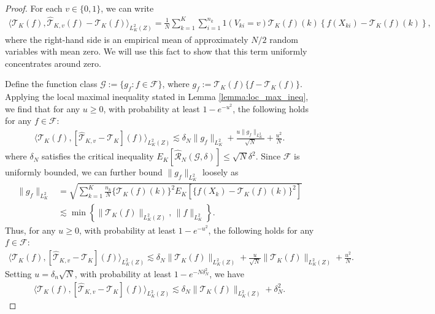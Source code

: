 \documentclass[11pt]{article}
\theoremstyle{plain}
\theoremstyle{definition}
\theoremstyle{remark}
\theoremstyle{definition}
\begin{document}
\begin{proof}

For each $v \in \{0,1\}$, we can write
\begin{align*}
    \langle  \mathcal{T}_{K}(f), \widehat{\mathcal{T}}_{K,v}(f) - \mathcal{T}_{K}(f)\rangle_{L^2_K(Z)} =  \frac{1}{N} \sum_{k=1}^K \sum_{i=1}^{n_k} 1(V_{ki} = v) \mathcal{T}_{K}(f)(k)\left\{f(X_{ki}) - \mathcal{T}_{K}(f)(k) \right\},
\end{align*}
where the right-hand side is an empirical mean of approximately $N/2$ random variables with mean zero. We will use this fact to show that this term uniformly concentrates around zero. 



    Define the function class $\mathcal{G} := \{g_f: f \in \mathcal{F} \}$, where $g_f:= \mathcal{T}_{K}(f)\{f -  \mathcal{T}_{K}(f)\}$. Applying the local maximal inequality stated in Lemma \ref{lemma:loc_max_ineq}, we find that for any $u \geq 0$, with probability at least $1 - e^{-u^2}$, the following holds for any $f \in \mathcal{F}$:
\begin{align*}
  \langle  \mathcal{T}_{K}(f), [\widehat{\mathcal{T}}_{K,v} -  \mathcal{T}_{K}](f) \rangle_{L^2_K(Z)} \lesssim \delta_N \|g_f\|_{L^2_K} + \frac{u\|g_f\|_{L^2_K}}{\sqrt{N}} + \frac{u^2}{N}.
\end{align*}
where $\delta_N$ satisfies the critical inequality $E_K[\widehat{\mathcal{R}}_N(\mathcal{G}, \delta)]\leq \sqrt{N} \delta^2$. Since $\mathcal{F}$ is uniformly bounded, we can further bound $\|g_f\|_{L^2_K}$ loosely as
\begin{align*}
    \|g_f\|_{L^2_K} &= \sqrt{\sum_{k=1}^{K} \frac{n_k}{N}\{ \mathcal{T}_{K}(f)(k)\}^2 E_K\left[\{f(X_{k}) - \mathcal{T}_{K}(f)(k)\}^2\right]} \\
        &\lesssim \min \left\{ \|\mathcal{T}_{K}(f)\|_{L^2_K(Z)},\, \|f\|_{L^2_K} \right\}.
\end{align*}
Thus, for any $u \geq 0$, with probability at least $1 - e^{-u^2}$, the following holds for any $f \in \mathcal{F}$:
\begin{align*}
  \langle  \mathcal{T}_{K}(f), [\widehat{\mathcal{T}}_{K,v} -  \mathcal{T}_{K}](f) \rangle_{L^2_K(Z)} \lesssim \delta_N   \|\mathcal{T}_{K}(f)\|_{L^2_K(Z)}  + \frac{u}{\sqrt{N}} \|\mathcal{T}_{K}(f)\|_{L^2_K(Z)}  + \frac{u^2}{N}.
\end{align*}
Setting $u = \delta_n \sqrt{N}$, with probability at least $1 - e^{-N\delta_N^2}$, we have
\begin{align*}
   \langle  \mathcal{T}_{K}(f), [\widehat{\mathcal{T}}_{K,v} -  \mathcal{T}_{K}](f) \rangle_{L^2_K(Z)} \lesssim \delta_N   \|\mathcal{T}_{K}(f)\|_{L^2_K(Z)} + \delta_N^2 .
\end{align*} 


 
 

\end{proof}
 
\end{document}
